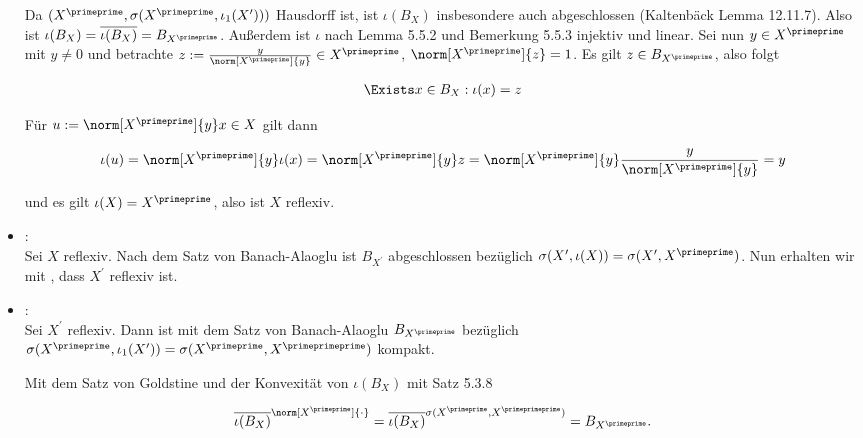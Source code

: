 \begin{solution}
\begin{itemize}

  Da $(X^\primeprime, \sigma(X^\primeprime, \iota_1(X^\prime)))$ Hausdorff ist, ist $\iota(B_X)$ insbesondere auch abgeschlossen (Kaltenbäck Lemma 12.11.7).
  Also ist $\iota(B_X) = \overline{\iota(B_X)} = B_{X^\primeprime}$.
  Außerdem ist $\iota$ nach Lemma 5.5.2 und Bemerkung 5.5.3 injektiv und linear.
  Sei nun $y \in X^\primeprime$ mit $y \neq 0$ und betrachte $z := \frac{y}{\norm[X^\primeprime]{y}} \in X^\primeprime$, $\norm[X^\primeprime]{z} = 1$.
  Es gilt $z \in B_{X^\primeprime}$, also folgt

  \begin{align*}
    \Exists x \in B_X:
    \iota(x) = z
  \end{align*}

  Für $u := \norm[X^\primeprime]{y} x \in X$ gilt dann

  \begin{align*}
    \iota(u)
    =
    \norm[X^\primeprime]{y} \iota(x)
    =
    \norm[X^\primeprime]{y} z
    =
    \norm[X^\primeprime]{y} \frac{y}{\norm[X^\primeprime]{y}}
    = y
  \end{align*}

  und es gilt $\iota(X) = X^\primeprime$, also ist $X$ reflexiv.

  \item
  : \\

  Sei $X$ reflexiv.
  Nach dem Satz von Banach-Alaoglu ist $B_{X^\prime}$ abgeschlossen bezüglich $\sigma(X^\prime, \iota(X)) = \sigma(X^\prime, X^\primeprime)$.
  Nun erhalten wir mit , dass $X^\prime$ reflexiv ist.

  \item
  : \\

  Sei $X^\prime$ reflexiv.
  Dann ist mit dem Satz von Banach-Alaoglu $B_{X^\primeprime}$ bezüglich $\sigma(X^\primeprime, \iota_1(X^\prime)) = \sigma(X^\primeprime, X^\primeprimeprime)$ kompakt.


  Mit dem Satz von Goldstine und der Konvexität von $\iota(B_X)$ mit Satz 5.3.8

  \begin{align*}
    \overline{\iota(B_X)}^{\norm[X^\primeprime]{\cdot}}
    =
    \overline{\iota(B_X)}^{\sigma(X^\primeprime, X^\primeprimeprime)}
    =
    B_{X^\primeprime}.
  \end{align*}


\end{itemize}
\end{solution}
